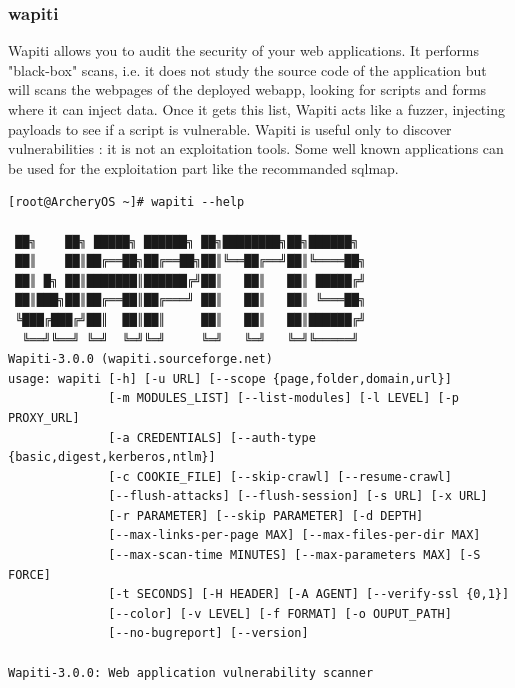 \documentclass{article}
\begin{document}
\subsubsection{wapiti}
Wapiti allows you to audit the security of your web applications.
It  performs "black-box" scans, i.e. it does not study the source code of the application but will scans the webpages of the deployed webapp, looking for scripts and forms where it can inject data.
Once it gets this list, Wapiti acts like a fuzzer, injecting payloads to see if a script is vulnerable.
Wapiti is useful only to discover vulnerabilities : it is not an exploitation tools. Some well known applications can be used for the exploitation part like the recommanded sqlmap.
\begin{lstlisting}
[root@ArcheryOS ~]# wapiti --help

 ██╗    ██╗ █████╗ ██████╗ ██╗████████╗██╗██████╗ 
 ██║    ██║██╔══██╗██╔══██╗██║╚══██╔══╝██║╚════██╗
 ██║ █╗ ██║███████║██████╔╝██║   ██║   ██║ █████╔╝
 ██║███╗██║██╔══██║██╔═══╝ ██║   ██║   ██║ ╚═══██╗
 ╚███╔███╔╝██║  ██║██║     ██║   ██║   ██║██████╔╝
  ╚══╝╚══╝ ╚═╝  ╚═╝╚═╝     ╚═╝   ╚═╝   ╚═╝╚═════╝  
Wapiti-3.0.0 (wapiti.sourceforge.net)
usage: wapiti [-h] [-u URL] [--scope {page,folder,domain,url}]
              [-m MODULES_LIST] [--list-modules] [-l LEVEL] [-p PROXY_URL]
              [-a CREDENTIALS] [--auth-type {basic,digest,kerberos,ntlm}]
              [-c COOKIE_FILE] [--skip-crawl] [--resume-crawl]
              [--flush-attacks] [--flush-session] [-s URL] [-x URL]
              [-r PARAMETER] [--skip PARAMETER] [-d DEPTH]
              [--max-links-per-page MAX] [--max-files-per-dir MAX]
              [--max-scan-time MINUTES] [--max-parameters MAX] [-S FORCE]
              [-t SECONDS] [-H HEADER] [-A AGENT] [--verify-ssl {0,1}]
              [--color] [-v LEVEL] [-f FORMAT] [-o OUPUT_PATH]
              [--no-bugreport] [--version]

Wapiti-3.0.0: Web application vulnerability scanner


\end{lstlisting}
\end{document}
